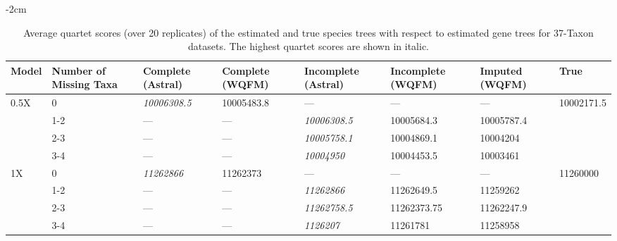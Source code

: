 \documentclass[10pt,a4paper]{article}
\begin{document}
\begin{appendices}
\begin{table}[H]
\begin{tabularx}{1.2\textwidth}{|X|X|X|X|X|X|X|}
    
    


\hline
    
\end{tabularx}

\end{table}

% 

\begin{table}[H]
  \small
  \centering
    \addtolength{\leftskip} {-2cm} %
    \addtolength{\rightskip}{-2cm}
    \caption{Average quartet scores (over 20 replicates) of the estimated and true species trees with respect to estimated gene trees for 37-Taxon datasets. %
    The highest quartet scores are shown in italic.}
    \label{tab:qscore-37-complete}
\begin{tabularx}{1.2\textwidth}{|X|X|X|X|X|X|X|X|}


\hline
    Model & Number of Missing Taxa  & Complete (Astral)  & Complete (WQFM) & Incomplete (Astral) & Incomplete (WQFM)  &	Imputed (WQFM) & True \\
    \hline\hline
    \multirow{4}{0.25\textwidth}{0.5X} 
    & 0   & \textit{10006308.5}	& 10005483.8 & --- & --- & --- & \multirow{4}{0.25\textwidth}{ 10002171.5}  \\ \cline{2-7}
    & 1-2 & --- & --- &	\textit{10006308.5}  & 10005684.3	
    & 10005787.4 &  \\ \cline{2-7}
    & 2-3 & --- & ---  & \textit{10005758.1}  &	10004869.1
    & 10004204 & \\ \cline{2-7}
    & 3-4 & ---	& ---  &	\textit{10004950}		
    & 10004453.5	& 10003461 & \\ \cline{2-7}
    \hline
    
    \multirow{4}{0.25\textwidth}{1X} 
    & 0 & \textit{11262866} & 11262373 & --- & --- & --- & \multirow{4}{0.25\textwidth}{11260000}  \\ \cline{2-7}
    & 1-2 & --- & ---  &	\textit{11262866} & 11262649.5
    &	11259262 &  \\ \cline{2-7}
    & 2-3 & --- &	---	 &	\textit{11262758.5}	&	11262373.75
    & 11262247.9 &  \\ \cline{2-7}
    & 3-4 & --- &	---  & \textit{1126207}	
	 &	11261781  &	11258958 &   \\ \cline{2-7}
    \hline
    

\end{tabularx}
\end{table}
\end{appendices}
\end{document}
